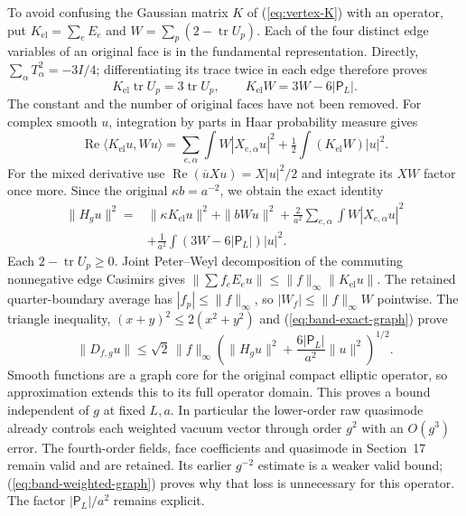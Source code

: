 To avoid confusing the Gaussian matrix $K$ of (\ref{eq:vertex-K})
with an operator, put $K_{\mathrm{el}}=\sum_eE_e$ and
$W=\sum_p(2-\operatorname{tr}U_p)$. Each of the four distinct edge
variables of an original face is in the fundamental representation.
Directly, $\sum_\alpha T_\alpha^2=-3I/4$; differentiating its
trace twice in each edge therefore proves
\[
 K_{\mathrm{el}}\operatorname{tr}U_p=3\operatorname{tr}U_p,
 \qquad K_{\mathrm{el}}W=3W-6|\mathsf P_L|.
\]
The constant and the number of original faces have not been removed.
For complex smooth $u$, integration by parts in Haar probability
measure gives
\[
 \operatorname{Re}\langle K_{\mathrm{el}}u,Wu\rangle
 =\sum_{e,\alpha}\int W|X_{e,\alpha}u|^2
       +\tfrac12\int(K_{\mathrm{el}}W)|u|^2.
\]
For the mixed derivative use
$\operatorname{Re}(\overline u Xu)=X|u|^2/2$ and integrate its
$XW$ factor once more. Since the original $\kappa b=a^{-2}$,
we obtain the exact identity
\begin{align}
 \|H_gu\|^2={}&\|\kappa K_{\mathrm{el}}u\|^2+\|bWu\|^2
   +\frac2{a^2}\sum_{e,\alpha}\int W|X_{e,\alpha}u|^2\nonumber\\
 &+\frac1{a^2}\int(3W-6|\mathsf P_L|)|u|^2.
 \label{eq:band-exact-graph}
\end{align}
Each $2-\operatorname{tr}U_p\ge0$. Joint Peter--Weyl decomposition
of the commuting nonnegative edge Casimirs gives
$\|\sum f_eE_eu\|\le\|f\|_\infty\|K_{\mathrm{el}}u\|$.
The retained quarter-boundary average has $|f_p|\le\|f\|_\infty$,
so $|W_f|\le\|f\|_\infty W$ pointwise. The triangle inequality,
$(x+y)^2\le2(x^2+y^2)$ and (\ref{eq:band-exact-graph}) prove
\begin{equation}\label{eq:band-weighted-graph}
 \|D_{f,g}u\|\le\sqrt2\,\|f\|_\infty
 \left(\|H_gu\|^2+\frac{6|\mathsf P_L|}{a^2}\|u\|^2\right)^{1/2}.
\end{equation}
Smooth functions are a graph core for the original compact elliptic
operator, so approximation extends this to its full operator domain.
This proves a bound independent of $g$ at fixed $L,a$. In particular
the lower-order raw quasimode already controls each weighted vacuum
vector through order $g^2$ with an $O(g^3)$ error. The fourth-order
fields, face coefficients and quasimode in Section~17 remain valid
and are retained. Its earlier $g^{-2}$ estimate is a weaker valid
bound; (\ref{eq:band-weighted-graph}) proves why that loss is unnecessary
for this operator. The factor $|\mathsf P_L|/a^2$ remains explicit.

